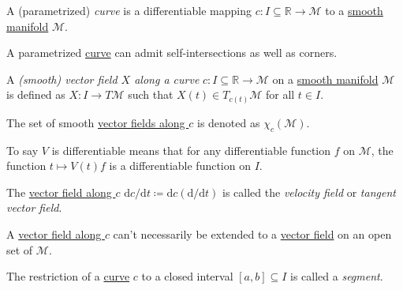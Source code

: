 \begin{definition}[Curve]\label{def:curve}
	A (parametrized) \emph{curve} is a differentiable mapping \(c\colon I \subseteq \mathbb{R} \to \mathcal{M} \) to a \hyperref[def:smooth-manifold]{smooth manifold} \(\mathcal{M} \).
\end{definition}

\begin{note}
	A parametrized \hyperref[def:curve]{curve} can admit self-intersections as well as corners.
	\begin{center}
	\end{center}
\end{note}

\begin{definition}\label{def:vector-field-along-curve}
	A \emph{(smooth) vector field \(X\) along a curve} \(c\colon I \subseteq \mathbb{R} \to \mathcal{M} \) on a \hyperref[def:smooth-manifold]{smooth manifold} \(\mathcal{M} \) is defined as \(X\colon I \to T \mathcal{M} \) such that \(X(t)\in T_{c(t)} \mathcal{M} \) for all \(t\in I\).
\end{definition}

\begin{notation}
	The set of smooth \hyperref[def:vector-field-along-curve]{vector fields along \(c\)} is denoted as \(\chi _c(\mathcal{M} )\).
\end{notation}

\begin{note}
	To say \(V\) is differentiable means that for any differentiable function \(f\) on \(\mathcal{M} \), the function \(t \mapsto V(t) f\) is a differentiable function on \(I\).
\end{note}

\begin{eg}
	The \hyperref[def:vector-field-along-curve]{vector field along \(c\)} \(\mathrm{d} c / \mathrm{d} t \coloneqq \mathrm{d} c (\mathrm{d} / \mathrm{d} t)\) is called the \emph{velocity field} or \emph{tangent vector field}.
\end{eg}

\begin{remark}
	A \hyperref[def:vector-field-along-curve]{vector field along \(c\)} can't necessarily be extended to a \hyperref[def:vector-field]{vector field} on an open set of \(\mathcal{M} \).
\end{remark}

\begin{notation}[Segment]
	The restriction of a \hyperref[def:curve]{curve} \(c\) to a closed interval \([a, b] \subseteq I\) is called a \emph{segment}.
\end{notation}

